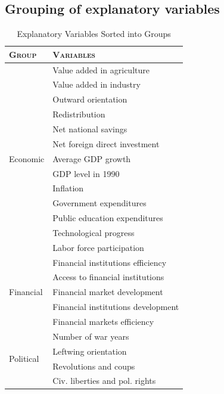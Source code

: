 \begin{refsection}
\begin{subappendices}
    \section{Grouping of explanatory variables}
    \begin{table}[ht!]
    \footnotesize
    \caption{Explanatory Variables Sorted into Groups}
    \label{ch3tab:groups}
    \centering
    \begin{tabular}{ll}
      \toprule
      \textsc{Group} & \textsc{Variables} \\
      \midrule
      \multirow{13}{*}{Economic}   & Value added in agriculture \\
                    & Value added in industry \\
                    & Outward orientation \\
                    & Redistribution \\
                    & Net national savings  \\
                    & Net foreign direct investment \\
                    & Average GDP growth \\
                    & GDP level in 1990 \\
                    & Inflation \\
                    & Government expenditures \\
                    & Public education expenditures \\
                    & Technological progress \\
                    & Labor force participation \\
    
      \midrule
      \multirow{5}{*}{Financial}   & Financial institutions efficiency \\
                    & Access to financial institutions  \\ 
                    & Financial market development \\
                    & Financial institutions development \\
                    & Financial markets efficiency \\
        
      \midrule
      \multirow{4}{*}{Political}  & Number of war years  \\
                    & Leftwing orientation \\
                    & Revolutions and coups \\
                    & Civ. liberties and pol. rights \\
    

\end{tabular}
\end{table}
\end{subappendices}
\end{refsection}
